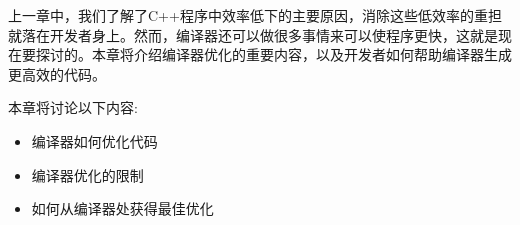 上一章中，我们了解了C++程序中效率低下的主要原因，消除这些低效率的重担就落在开发者身上。然而，编译器还可以做很多事情来可以使程序更快，这就是现在要探讨的。本章将介绍编译器优化的重要内容，以及开发者如何帮助编译器生成更高效的代码。 

本章将讨论以下内容:

\begin{itemize}
\item
编译器如何优化代码

\item
编译器优化的限制

\item
如何从编译器处获得最佳优化
\end{itemize}